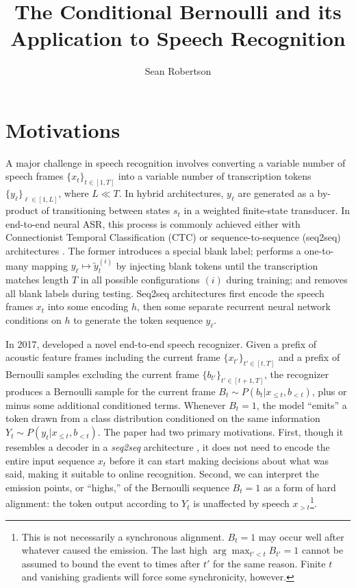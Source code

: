 \documentclass{article}
\title{The Conditional Bernoulli and its Application to Speech Recognition}
\author{Sean Robertson}
\begin{document}
\maketitle

\section{Motivations} \label{sec:motivations}

A major challenge in speech recognition involves converting a variable number
of speech frames $\{x_t\}_{t \in [1, T]}$ into a variable number of
transcription tokens $\{y_\ell\}_{\ell \in [1, L]}$, where $L \ll T$. In hybrid
architectures, $y_\ell$ are generated as a by-product of transitioning between
states $s_t$ in a weighted finite-state transducer. In end-to-end neural ASR,
this process is commonly achieved either with Connectionist Temporal
Classification (CTC) \cite{gravesConnectionistTemporalClassification2006} or
sequence-to-sequence (seq2seq) architectures
\cite{bahdanauNeuralMachineTranslation2015}. The former introduces a special
blank label; performs a one-to-many mapping $y_\ell \mapsto \tilde{y}_t^{(i)}$
by injecting blank tokens until the transcription matches length $T$ in all
possible configurations $(i)$ during training; and removes all blank labels
during testing. Seq2seq architectures first encode the speech frames $x_t$ into
some encoding $h$, then some separate recurrent neural network conditions on
$h$ to generate the token sequence $y_\ell$.

In 2017, \citeauthor{luoLearningOnlineAlignments2017} developed a novel
end-to-end speech recognizer. Given a prefix of acoustic feature frames
including the current frame $\{x_{t'}\}_{t' \in [t, T]}$ and a prefix of
Bernoulli samples excluding the current frame $\{b_{t'}\}_{t' \in [t+1,T]}$,
the recognizer produces a Bernoulli sample for the current frame $B_t \sim
P(b_t|x_{\leq t}, b_{<t})$, plus or minus some additional conditioned terms.
Whenever $B_t = 1$, the model ``emits'' a token drawn from a class distribution
conditioned on the same information $Y_t \sim P(y_t|x_{\leq t}, b_{<t})$. The
paper had two primary motivations. First, though it resembles a decoder in a
\textit{seq2seq} architecture \cite{bahdanauNeuralMachineTranslation2015}, it
does not need to encode the entire input sequence $x_t$ before it can start
making decisions about what was said, making it suitable to online recognition.
Second, we can interpret the emission points, or ``highs,'' of the Bernoulli
sequence $B_t = 1$ as a form of hard alignment: the token output according to
$Y_t$ is unaffected by speech $x_{>t}$\footnote{
%
    This is not necessarily a synchronous alignment. $B_t = 1$ may occur well
    after whatever caused the emission. The last high $\arg\max_{t' < t} B_{t'}
    = 1$ cannot be assumed to bound the event to times after $t'$ for the same
    reason. Finite $t$ and vanishing gradients will force some synchronicity,
    however.
%
}.
\end{document}
